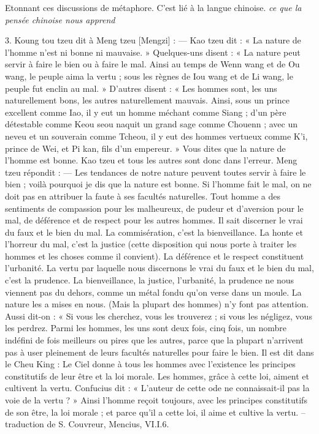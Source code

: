 Etonnant ces discussions de métaphore. C'est lié à la langue chinoise. \cite{vandermeersch_ce_2019} \textit{ce que la pensée chinoise nous apprend} 
\begin{singlequote}
    3.	Koung tou tzeu dit à Meng tzeu [Mengzi] :
—	Kao tzeu dit : « La nature de l’homme n’est ni bonne ni mauvaise. » Quelques-uns disent :
« La nature peut servir à faire le bien ou à faire le mal. Ainsi au temps de Wenn wang et de Ou wang, le peuple aima la vertu ; sous les règnes de Iou wang et de Li wang, le peuple fut enclin au mal. » D’autres disent : « Les hommes sont, les uns naturellement bons, les autres naturellement mauvais. Ainsi, sous un prince excellent comme Iao, il y eut un homme méchant comme Siang ; d’un père détestable comme Keou seou naquit un grand sage comme Chouenn ; avec un neveu et un souverain comme Tcheou, il y eut des hommes vertueux comme K’i, prince
de Wei, et Pi kan, fils d’un empereur. » Vous dites que la nature de l’homme est bonne. Kao tzeu et tous les autres sont donc dans l’erreur.
Meng tzeu répondit :
—	Les tendances de notre nature peuvent toutes servir à faire le bien ; voilà pourquoi je dis que la nature est bonne. Si l’homme fait le mal, on ne doit pas en attribuer la faute à ses facultés naturelles.
Tout homme a des sentiments de compassion pour les malheureux, de pudeur et d’aversion pour le mal, de déférence et de respect pour les autres hommes. Il sait discerner le vrai du faux et le bien du mal. La commisération, c’est la bienveillance. La honte et l’horreur du mal, c’est la justice (cette disposition qui nous porte à traiter les hommes et les choses comme il convient). La déférence et le respect constituent l’urbanité. La vertu par laquelle nous discernons le vrai du faux et le bien du mal, c’est la prudence. La bienveillance, la justice, l’urbanité, la prudence ne nous viennent pas du dehors, comme un métal fondu qu’on verse dans un moule. La nature les a mises en nous. (Mais la plupart des hommes) n’y font pas attention. Aussi dit-on : « Si vous les cherchez, vous les trouverez ; si vous les négligez, vous les perdrez. Parmi les hommes, les uns sont deux fois, cinq fois, un nombre indéfini de fois meilleurs ou pires que les autres, parce que la plupart n’arrivent pas à user pleinement de leurs facultés naturelles pour faire le bien.
Il est dit dans le Cheu King :
Le Ciel donne à tous les hommes avec l’existence les principes constitutifs de leur être et la loi morale. Les hommes, grâce à cette loi, aiment et cultivent la vertu.
Confucius dit : « L’auteur de cette ode ne connaissait-il pas la voie de la vertu ? » Ainsi l’homme reçoit toujours, avec les principes constitutifs de son être, la loi morale ; et parce qu’il a cette loi, il aime et cultive la vertu.
-- traduction de S. Couvreur, Mencius, VI.I.6.

\end{singlequote}

